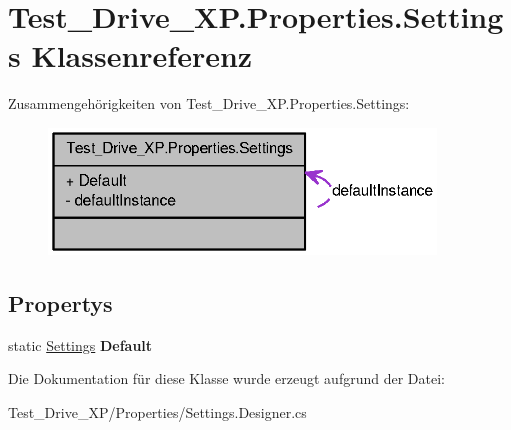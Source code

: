\hypertarget{class_test___drive___x_p_1_1_properties_1_1_settings}{
\section{Test\_\-Drive\_\-XP.Properties.Settings Klassenreferenz}
\label{class_test___drive___x_p_1_1_properties_1_1_settings}
}


Zusammengehörigkeiten von Test\_\-Drive\_\-XP.Properties.Settings:\nopagebreak
\begin{figure}[H]
\begin{center}
\leavevmode
\includegraphics[width=292pt]{class_test___drive___x_p_1_1_properties_1_1_settings__coll__graph}
\end{center}
\end{figure}
\subsection*{Propertys}
\begin{DoxyCompactItemize}
\item 
\hypertarget{class_test___drive___x_p_1_1_properties_1_1_settings_ad479df3234d62ff6a42beeee68375587}{
static \hyperlink{class_test___drive___x_p_1_1_properties_1_1_settings}{Settings} {\bfseries Default}}
\label{class_test___drive___x_p_1_1_properties_1_1_settings_ad479df3234d62ff6a42beeee68375587}

\end{DoxyCompactItemize}


Die Dokumentation für diese Klasse wurde erzeugt aufgrund der Datei:\begin{DoxyCompactItemize}
\item 
Test\_\-Drive\_\-XP/Properties/Settings.Designer.cs\end{DoxyCompactItemize}
